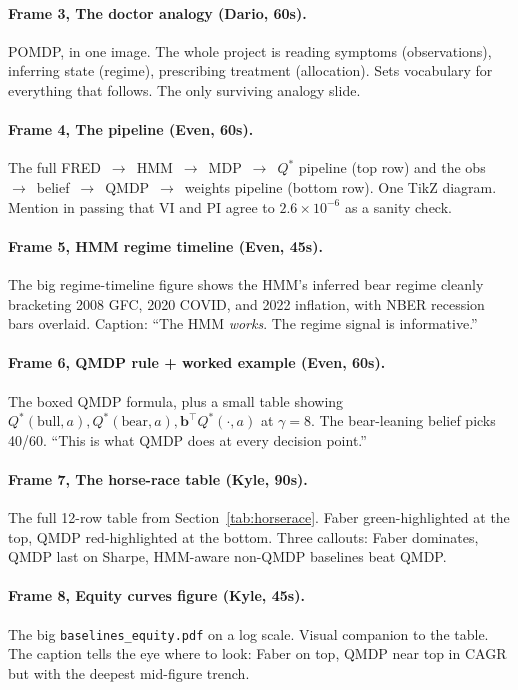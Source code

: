 \documentclass[11pt]{article}
\newcommand{\bel}{\mathbf{b}}
\begin{document}
\paragraph{Frame 3, The doctor analogy (Dario, 60s).} POMDP, in one image. The whole project is reading symptoms (observations), inferring state (regime), prescribing treatment (allocation). Sets vocabulary for everything that follows. The only surviving analogy slide.

\paragraph{Frame 4, The pipeline (Even, 60s).} The full FRED~$\to$~HMM~$\to$~MDP~$\to$~$Q^*$ pipeline (top row) and the obs~$\to$~belief~$\to$~QMDP~$\to$~weights pipeline (bottom row). One TikZ diagram. Mention in passing that VI and PI agree to $2.6 \times 10^{-6}$ as a sanity check.

\paragraph{Frame 5, HMM regime timeline (Even, 45s).} The big regime-timeline figure shows the HMM's inferred bear regime cleanly bracketing 2008 GFC, 2020 COVID, and 2022 inflation, with NBER recession bars overlaid. Caption: ``The HMM \emph{works}. The regime signal is informative.''

\paragraph{Frame 6, QMDP rule + worked example (Even, 60s).} The boxed QMDP formula, plus a small table showing $Q^*(\text{bull}, a), Q^*(\text{bear}, a), \bel^\top Q^*(\cdot, a)$ at $\gamma = 8$. The bear-leaning belief picks 40/60. ``This is what QMDP does at every decision point.''

\paragraph{Frame 7, The horse-race table (Kyle, 90s).} The full 12-row table from Section~\ref{tab:horserace}. Faber green-highlighted at the top, QMDP red-highlighted at the bottom. Three callouts: Faber dominates, QMDP last on Sharpe, HMM-aware non-QMDP baselines beat QMDP.

\paragraph{Frame 8, Equity curves figure (Kyle, 45s).} The big \texttt{baselines\_equity.pdf} on a log scale. Visual companion to the table. The caption tells the eye where to look: Faber on top, QMDP near top in CAGR but with the deepest mid-figure trench.
\end{document}
